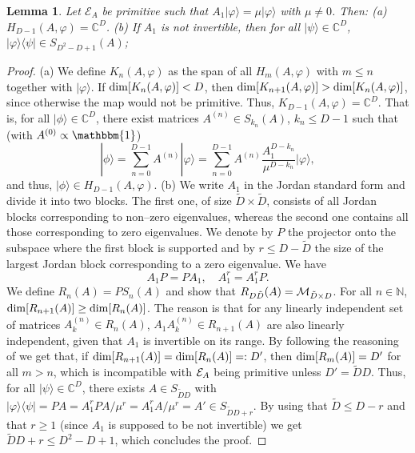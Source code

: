 \documentclass[journal,twoside]{IEEEtran}
\newtheorem{lemma}{Lemma}
\newcommand{\1}{\mathbbm{1}}
\def\E{{\cal E}}
\renewcommand{\>}{\rangle}
\newcommand{\<}{\langle}
\def\C{\mathbb{C}}
\def\E{\mathcal{E}}
\def\1{\mathbbm{1}}
\begin{document}
\begin{lemma}\label{lemma2}
Let ${\E}_A$ be primitive such that $A_1|\varphi\rangle =
\mu|\varphi\rangle$ with $\mu\ne 0$. Then: (a)
$H_{D-1}(A,\varphi)=\C^D$. (b) If $A_1$ is not invertible, then for
all $|\psi\rangle\in \C^D$, $|\varphi\rangle\langle\psi|\in
S_{D^2-D+1}(A)$;
\end{lemma}

\begin{proof}
(a) We define  $K_n(A,\varphi)$ as the span of all $H_m(A,\varphi)$
with $m\le n$ together with $|\varphi\rangle$. If ${\rm
dim}[K_n(A,\varphi)]<D$, then ${\rm dim}[K_{n+1}(A,\varphi)]>{\rm
dim}[K_{n}(A,\varphi)]$, since otherwise the map would not be
primitive. Thus, $K_{D-1}(A,\varphi)=\C^D$. That is, for all
$|\phi\> \in \C^D$, there exist matrices $A^{(n)}\in S_{k_n}(A)$,
$k_n\le D-1$ such that (with $A^{(0)}\propto\1$)
 \begin{equation}
 |\phi\rangle = \sum_{n=0}^{D-1} A^{(n)} |\varphi\rangle=
 \sum_{n=0}^{D-1} A^{(n)} \frac{A_1^{D-k_n}}{\mu^{D-k_n}}|\varphi\rangle,
 \end{equation}
and thus, $|\phi\rangle\in H_{D-1}(A,\varphi)$. (b) We write $A_1$ in
the Jordan standard form and divide it into two blocks. The first
one, of size $\tilde D\times \tilde D$, consists of all Jordan
blocks corresponding to non--zero eigenvalues, whereas the second
one contains all those corresponding to zero eigenvalues. We denote
by $P$ the projector onto the subspace where the first block is
supported and by $r\le
D-\tilde D$ the size of the largest Jordan block corresponding to a
zero eigenvalue. We have
 \begin{equation}
 \label{propA1}
 A_1 P = P A_1, \quad A_1^r =A_1^r P.
 \end{equation}
We define $R_n(A)=PS_n(A)$ and show that $R_{D\tilde D}(A)={\cal
M}_{\tilde D\times D}$. For all $n\in \mathbb{N}$, ${\rm
dim}[R_{n+1}(A)]\ge{\rm dim}[R_{n}(A)]$. The reason is that for any
linearly independent set of matrices $A^{(n)}_k\in R_n(A)$,
$A_1A^{(n)}_k\in R_{n+1}(A)$ are also linearly independent, given
that $A_1$ is invertible on its range. By following the reasoning of
\cite[Appendix A]{PVWC07} we get that, if ${\rm
dim}[R_{n+1}(A)]={\rm dim}[R_{n}(A)]=:D'$, then ${\rm
dim}[R_m(A)]=D'$ for all $m>n$, which is incompatible with ${\cal
E}_A$ being primitive unless $D'=\tilde D D$. Thus, for all
$|\psi\rangle\in \C^D$, there exists $A\in S_{\tilde D D}$ with
$|\varphi\rangle\langle \psi|= PA= A_1^r P A/\mu^r = A_1^r A/\mu^r
=A'\in S_{\tilde D D+r}$. By using that $\tilde{D}\leq D-r$ and that
$r\geq 1$ (since $A_1$ is supposed to be not invertible) we get
$\tilde D D+r\le D^2-D+1$, which concludes the proof.
\end{proof}
\end{document}
